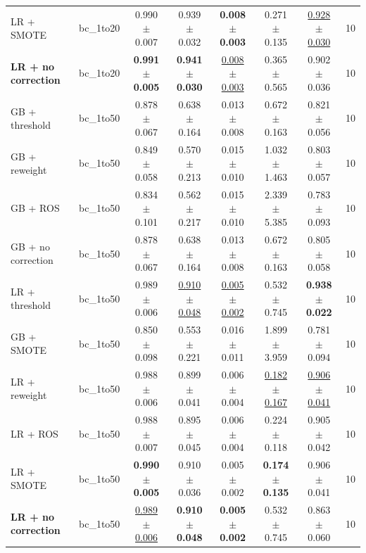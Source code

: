 \begin{tabular}{llcccccc}
LR + SMOTE & bc\_1to20 & 0.990 $\pm$ 0.007 & 0.939 $\pm$ 0.032 & \textbf{0.008 $\pm$ 0.003} & 0.271 $\pm$ 0.135 & \underline{0.928 $\pm$ 0.030} & 10 \\
\textbf{LR + no correction} & bc\_1to20 & \textbf{0.991 $\pm$ 0.005} & \textbf{0.941 $\pm$ 0.030} & \underline{0.008 $\pm$ 0.003} & 0.365 $\pm$ 0.565 & 0.902 $\pm$ 0.036 & 10 \\
\midrule
GB + threshold & bc\_1to50 & 0.878 $\pm$ 0.067 & 0.638 $\pm$ 0.164 & 0.013 $\pm$ 0.008 & 0.672 $\pm$ 0.163 & 0.821 $\pm$ 0.056 & 10 \\
GB + reweight & bc\_1to50 & 0.849 $\pm$ 0.058 & 0.570 $\pm$ 0.213 & 0.015 $\pm$ 0.010 & 1.032 $\pm$ 1.463 & 0.803 $\pm$ 0.057 & 10 \\
GB + ROS & bc\_1to50 & 0.834 $\pm$ 0.101 & 0.562 $\pm$ 0.217 & 0.015 $\pm$ 0.010 & 2.339 $\pm$ 5.385 & 0.783 $\pm$ 0.093 & 10 \\
GB + no correction & bc\_1to50 & 0.878 $\pm$ 0.067 & 0.638 $\pm$ 0.164 & 0.013 $\pm$ 0.008 & 0.672 $\pm$ 0.163 & 0.805 $\pm$ 0.058 & 10 \\
LR + threshold & bc\_1to50 & 0.989 $\pm$ 0.006 & \underline{0.910 $\pm$ 0.048} & \underline{0.005 $\pm$ 0.002} & 0.532 $\pm$ 0.745 & \textbf{0.938 $\pm$ 0.022} & 10 \\
GB + SMOTE & bc\_1to50 & 0.850 $\pm$ 0.098 & 0.553 $\pm$ 0.221 & 0.016 $\pm$ 0.011 & 1.899 $\pm$ 3.959 & 0.781 $\pm$ 0.094 & 10 \\
LR + reweight & bc\_1to50 & 0.988 $\pm$ 0.006 & 0.899 $\pm$ 0.041 & 0.006 $\pm$ 0.004 & \underline{0.182 $\pm$ 0.167} & \underline{0.906 $\pm$ 0.041} & 10 \\
LR + ROS & bc\_1to50 & 0.988 $\pm$ 0.007 & 0.895 $\pm$ 0.045 & 0.006 $\pm$ 0.004 & 0.224 $\pm$ 0.118 & 0.905 $\pm$ 0.042 & 10 \\
LR + SMOTE & bc\_1to50 & \textbf{0.990 $\pm$ 0.005} & 0.910 $\pm$ 0.036 & 0.005 $\pm$ 0.002 & \textbf{0.174 $\pm$ 0.135} & 0.906 $\pm$ 0.041 & 10 \\
\textbf{LR + no correction} & bc\_1to50 & \underline{0.989 $\pm$ 0.006} & \textbf{0.910 $\pm$ 0.048} & \textbf{0.005 $\pm$ 0.002} & 0.532 $\pm$ 0.745 & 0.863 $\pm$ 0.060 & 10 \\
\bottomrule
\end{tabular}
